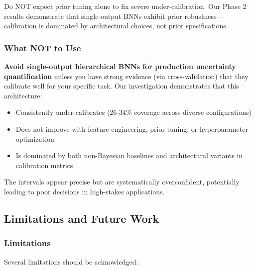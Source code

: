 Do NOT expect prior tuning alone to fix severe under-calibration. Our Phase 2 results demonstrate that single-output BNNs exhibit prior robustness—calibration is dominated by architectural choices, not prior specifications.

\subsubsection{What NOT to Use}

\textbf{Avoid single-output hierarchical BNNs for production uncertainty quantification} unless you have strong evidence (via cross-validation) that they calibrate well for your specific task. Our investigation demonstrates that this architecture:

\begin{itemize}
    \item Consistently under-calibrates (26-34\% coverage across diverse configurations)
    \item Does not improve with feature engineering, prior tuning, or hyperparameter optimization
    \item Is dominated by both non-Bayesian baselines and architectural variants in calibration metrics
\end{itemize}

The intervals appear precise but are systematically overconfident, potentially leading to poor decisions in high-stakes applications.

\subsection{Limitations and Future Work}
\label{subsec:limitations}

\subsubsection{Limitations}

Several limitations should be acknowledged:

